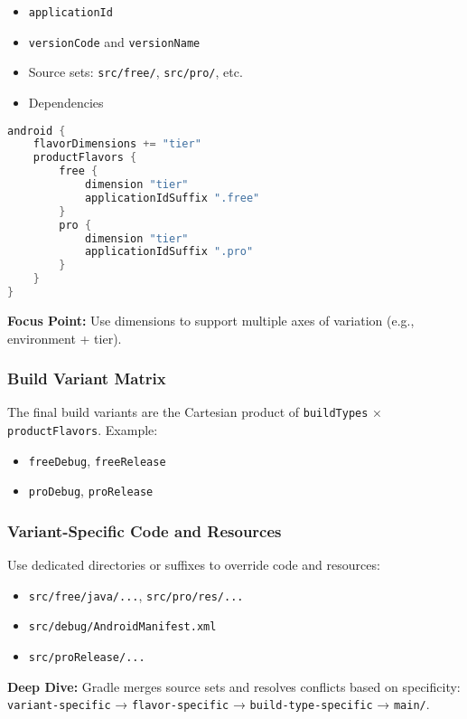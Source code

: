 \documentclass[a4paper,12pt]{article}
\begin{document}
\begin{itemize}
  \item \texttt{applicationId}
  \item \texttt{versionCode} and \texttt{versionName}
  \item Source sets: \texttt{src/free/}, \texttt{src/pro/}, etc.
  \item Dependencies
\end{itemize}

\begin{lstlisting}[language=Kotlin]
android {
    flavorDimensions += "tier"
    productFlavors {
        free {
            dimension "tier"
            applicationIdSuffix ".free"
        }
        pro {
            dimension "tier"
            applicationIdSuffix ".pro"
        }
    }
}
\end{lstlisting}

\textbf{Focus Point:} Use dimensions to support multiple axes of variation (e.g., environment + tier).

\subsubsection{Build Variant Matrix}

The final build variants are the Cartesian product of \texttt{buildTypes} × \texttt{productFlavors}. Example:

\begin{itemize}
  \item \texttt{freeDebug}, \texttt{freeRelease}
  \item \texttt{proDebug}, \texttt{proRelease}
\end{itemize}

\subsubsection{Variant-Specific Code and Resources}

Use dedicated directories or suffixes to override code and resources:

\begin{itemize}
  \item \texttt{src/free/java/...}, \texttt{src/pro/res/...}
  \item \texttt{src/debug/AndroidManifest.xml}
  \item \texttt{src/proRelease/...}
\end{itemize}

\textbf{Deep Dive:} Gradle merges source sets and resolves conflicts based on specificity: \texttt{variant-specific} → \texttt{flavor-specific} → \texttt{build-type-specific} → \texttt{main/}.
\end{document}
